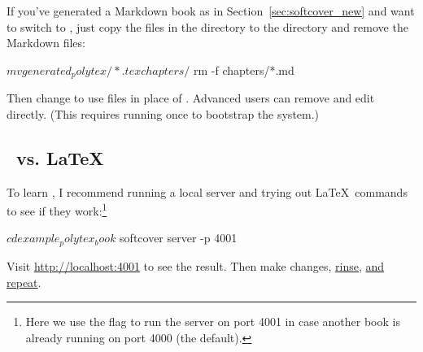 
If you've generated a Markdown book as in Section~\ref{sec:softcover_new} and want to switch to \PolyTeX, just copy the files in the  directory to the  directory and remove the Markdown files:

\begin{code}
$ mv generated_polytex/*.tex chapters/
$ rm -f chapters/*.md
\end{code}

\noindent Then change  to use  files in place of . Advanced users can remove  and edit  directly. (This requires running  once to bootstrap the system.)

\subsection{\PolyTeX\ vs. \LaTeX} %
\label{sec:polytex_vs_latex}

To learn \PolyTeX, I recommend running a local server and trying out \LaTeX\ commands to see if they work:\footnote{Here we use the  flag to run the server on port 4001 in case another book is already running on port 4000 (the default).}

\begin{code}
$ cd example_polytex_book
$ softcover server -p 4001
\end{code}

\noindent Visit \href{http://localhost:4001}{http://localhost:4001} to see the result. Then make changes, \href{http://www.urbandictionary.com/define.php?term=rinse%20repeat}{rinse}, \href{http://www.urbandictionary.com/define.php?term=rinse%20repeat}{and repeat}.







